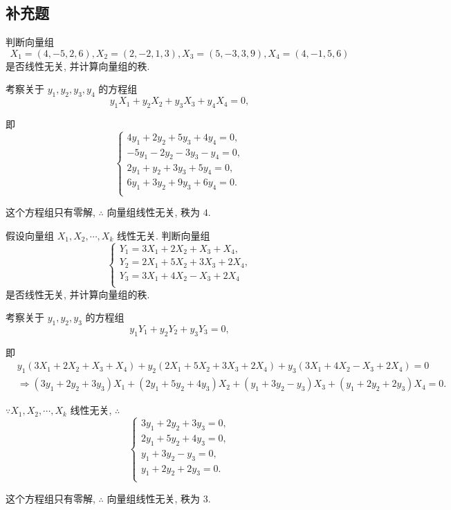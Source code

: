 \documentclass{ctexart}
\begin{document}
\subsection{补充题}
\begin{exercisec}[3.1.3(4)]
    判断向量组
    \[X_1=(4,-5,2,6),X_2=(2,-2,1,3),X_3=(5,-3,3,9),X_4=(4,-1,5,6)\]
    是否线性无关, 并计算向量组的秩.
\end{exercisec}
\begin{solution}
    考察关于 $y_1,y_2,y_3,y_4$ 的方程组
    \[y_1X_1+y_2X_2+y_3X_3+y_4X_4=0,\]

    即
    \[\begin{cases}
        4y_1+2y_2+5y_3+4y_4=0, \\
        -5y_1-2y_2-3y_3-y_4=0, \\
        2y_1+y_2+3y_3+5y_4=0, \\
        6y_1+3y_2+9y_3+6y_4=0. \\
    \end{cases}\]

    这个方程组只有零解, $\therefore$ 向量组线性无关, 秩为 $4$.
\end{solution}
\begin{exercisec}[3.1.4(1)]
    假设向量组 $X_1,X_2,\cdots,X_k$ 线性无关. 判断向量组
    \[\begin{cases}
        Y_1=3X_1+2X_2+X_3+X_4, \\
        Y_2=2X_1+5X_2+3X_3+2X_4, \\
        Y_3=3X_1+4X_2-X_3+2X_4 \\
    \end{cases}\]
    是否线性无关, 并计算向量组的秩.
\end{exercisec}
\begin{solution}
    考察关于 $y_1,y_2,y_3$ 的方程组
    \[y_1Y_1+y_2Y_2+y_3Y_3=0,\]
    
    即
    \begin{align*}
        & y_1(3X_1+2X_2+X_3+X_4)+y_2(2X_1+5X_2+3X_3+2X_4)+y_3(3X_1+4X_2-X_3+2X_4)=0 \\
        & \Rightarrow(3y_1+2y_2+3y_3)X_1+(2y_1+5y_2+4y_3)X_2+(y_1+3y_2-y_3)X_3+(y_1+2y_2+2y_3)X_4=0.
    \end{align*}

    $\because X_1,X_2,\cdots,X_k$ 线性无关, $\therefore$
    \[\begin{cases}
        3y_1+2y_2+3y_3=0, \\
        2y_1+5y_2+4y_3=0, \\
        y_1+3y_2-y_3=0, \\
        y_1+2y_2+2y_3=0. \\
    \end{cases}\]

    这个方程组只有零解, $\therefore$ 向量组线性无关, 秩为 $3$.
\end{solution}
\end{document}
